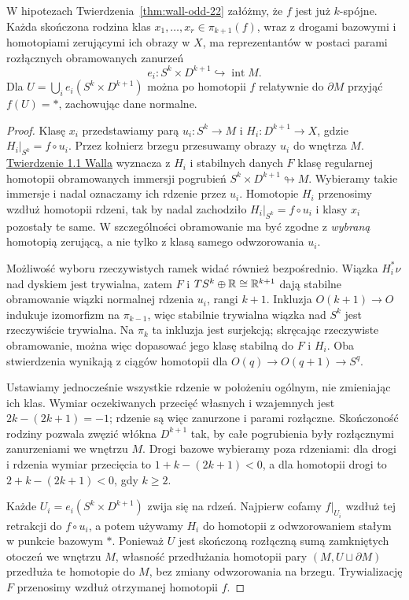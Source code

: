 \begin{lemat}
\label{lem:wall-odd-rozlaczne-sfery-22}
W hipotezach Twierdzenia~\ref{thm:wall-odd-22}
załóżmy, że $f$ jest już $k$-spójne.
Każda skończona rodzina klas
$x_1,\ldots,x_r\in\pi_{k+1}(f)$, wraz
z drogami bazowymi i homotopiami zerującymi
ich obrazy w $X$, ma reprezentantów w postaci
parami rozłącznych obramowanych zanurzeń
\[
 e_i:S^k\times D^{k+1}\hookrightarrow
       \operatorname{int}M.
\]
Dla $U=\bigcup_i e_i(S^k\times D^{k+1})$
można po homotopii $f$ relatywnie do $\partial M$
przyjąć $f(U)=*$, zachowując dane normalne.
\end{lemat}
\begin{proof}
Klasę $x_i$ przedstawiamy parą
$u_i:S^k\to M$ i $H_i:D^{k+1}\to X$,
gdzie $H_i|_{S^k}=f\circ u_i$.
Przez kołnierz brzegu przesuwamy obrazy
$u_i$ do wnętrza $M$.
\href{https://www.maths.ed.ac.uk/~v1ranick/books/scm.pdf}
{Twierdzenie 1.1 Walla} wyznacza z $H_i$
i stabilnych danych $F$ klasę regularnej
homotopii obramowanych immersji pogrubień
$S^k\times D^{k+1}\looparrowright M$.
Wybieramy takie immersje i nadal oznaczamy
ich rdzenie przez $u_i$.
Homotopie $H_i$ przenosimy wzdłuż homotopii
rdzeni, tak by nadal zachodziło
$H_i|_{S^k}=f\circ u_i$ i klasy $x_i$
pozostały te same.
W szczególności obramowanie ma być zgodne
z \emph{wybraną} homotopią zerującą, a nie
tylko z klasą samego odwzorowania $u_i$.

Możliwość wyboru rzeczywistych ramek widać
również bezpośrednio. Wiązka $H_i^*\nu$
nad dyskiem jest trywialna, zatem $F$
i $TS^k\oplus\mathbb{R}\cong\mathbb{R}^{k+1}$ dają
stabilne obramowanie wiązki normalnej
rdzenia $u_i$, rangi $k+1$.
Inkluzja $O(k+1)\to O$ indukuje izomorfizm
na $\pi_{k-1}$, więc stabilnie trywialna
wiązka nad $S^k$ jest rzeczywiście trywialna.
Na $\pi_k$ ta inkluzja jest surjekcją;
skręcając rzeczywiste obramowanie, można
więc dopasować jego klasę stabilną do $F$
i $H_i$. Oba stwierdzenia wynikają z ciągów
homotopii dla $O(q)\to O(q+1)\to S^q$.

Ustawiamy jednocześnie wszystkie rdzenie
w położeniu ogólnym, nie zmieniając ich klas.
Wymiar oczekiwanych przecięć własnych
i wzajemnych jest
$2k-(2k+1)=-1$; rdzenie są więc zanurzone
i parami rozłączne. Skończoność rodziny
pozwala zwęzić włókna $D^{k+1}$ tak, by
całe pogrubienia były rozłącznymi zanurzeniami
we wnętrzu $M$. Drogi bazowe wybieramy poza
rdzeniami: dla drogi i rdzenia wymiar przecięcia
to $1+k-(2k+1)<0$, a dla homotopii drogi
to $2+k-(2k+1)<0$, gdy $k\geq2$.

Każde $U_i=e_i(S^k\times D^{k+1})$ zwija się
na rdzeń. Najpierw cofamy $f|_{U_i}$ wzdłuż
tej retrakcji do $f\circ u_i$, a potem
używamy $H_i$ do homotopii z odwzorowaniem
stałym w punkcie bazowym $*$.
Ponieważ $U$ jest skończoną rozłączną sumą
zamkniętych otoczeń we wnętrzu $M$,
własność przedłużania homotopii pary
$(M,U\sqcup\partial M)$ przedłuża te
homotopie do $M$, bez zmiany odwzorowania na brzegu.
Trywializację $F$ przenosimy wzdłuż
otrzymanej homotopii $f$.
\end{proof}

